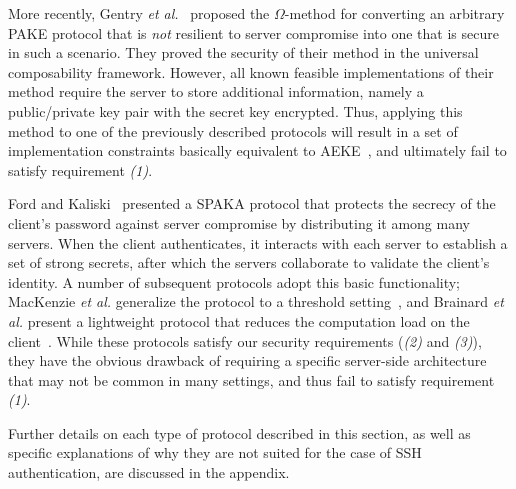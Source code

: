 More recently, Gentry \textit{et al.}~\cite{gentry06} proposed the
$\Omega$-method for converting an arbitrary PAKE protocol that is
\emph{not} resilient to server compromise into one that is secure in
such a scenario. They proved the security of their method in the
universal composability framework. However, all known feasible
implementations of their method require the server to store additional
information, namely a public/private key pair with the secret key
encrypted. Thus, applying this method to one of the previously
described protocols will result in a set of implementation constraints
basically equivalent to AEKE~\cite{bellovin93}, and ultimately fail to
satisfy requirement \textit{(1)}.

Ford and Kaliski~\cite{ford00} presented a SPAKA protocol that
protects the secrecy of the client's password against server
compromise by distributing it among many servers. When
the client authenticates, it interacts with each server to establish a
set of strong secrets, after which the servers collaborate to validate
the client's identity. A number of subsequent protocols adopt this
basic functionality; MacKenzie \textit{et al.} generalize the protocol
to a threshold setting~\cite{mackenzie02}, and Brainard \textit{et
  al.} present a lightweight protocol that reduces the computation
load on the client~\cite{brainard03}. While these protocols satisfy
our security requirements (\textit{(2)} and \textit{(3)}), they have
the obvious drawback of requiring a specific server-side architecture
that may not be common in many settings, and thus fail to satisfy
requirement \textit{(1)}.

Further details on each type of protocol described in this
section, as well as specific explanations of why they are not suited
for the case of SSH authentication, are discussed in the appendix.
